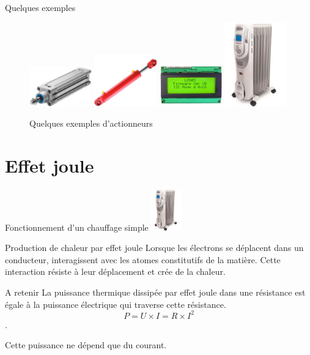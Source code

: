 \documentclass{beamer}
\begin{document}
\begin{frame}{Quelques exemples}
\begin{figure}[h]
          \includegraphics[width=0.24\textwidth]{images/verin_pneu}
          \includegraphics[width=0.24\textwidth]{images/verin_hydrqu}
          \includegraphics[width=0.24\textwidth]{images/afficheur}
          \includegraphics[width=0.24\textwidth]{images/radiateur}
        \caption{Quelques exemples d'actionneurs}
        \label{fig:exemples}
      \end{figure}
    \end{frame}

\section{Effet joule}
\begin{frame}{Fonctionnement d'un chauffage simple}
  \centering
  \includegraphics[width=0.1\textwidth]{images/radiateur}
  \begin{block}{Production de chaleur par effet joule}
    Lorsque les électrons se déplacent dans un conducteur, interagissent avec les atomes constitutifs de la matière. Cette interaction résiste à leur déplacement et crée de la chaleur.
  \end{block}

  \begin{alertblock}{A retenir}
    La puissance thermique dissipée par effet joule dans une résistance est égale à la puissance électrique qui traverse cette résistance.
    $$P=U\times I = R\times I^2$$.

    Cette puissance ne dépend que du courant.
  \end{alertblock}
\end{frame}
\end{document}
